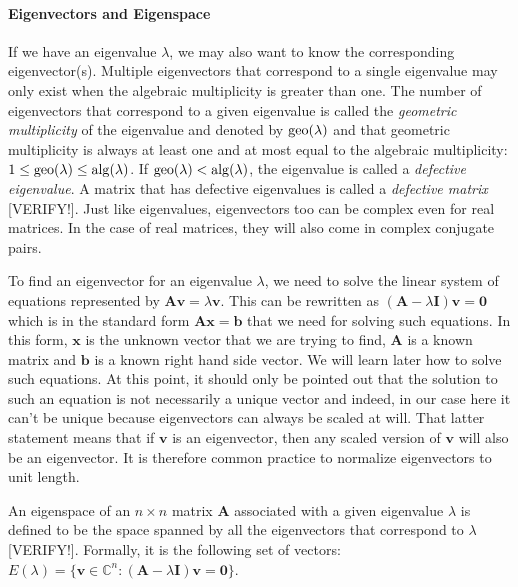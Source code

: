 \paragraph{Eigenvectors and Eigenspace}
If we have an eigenvalue $\lambda$, we may also want to know the corresponding eigenvector(s). Multiple eigenvectors that correspond to a single eigenvalue may only exist when the algebraic multiplicity is greater than one. The number of eigenvectors that correspond to a given eigenvalue is called the \emph{geometric multiplicity} of the eigenvalue and denoted by $\operatorname{geo}(\lambda)$ and that geometric multiplicity is always at least one and at most equal to the algebraic multiplicity: $1 \leq \operatorname{geo}(\lambda) \leq \operatorname{alg}(\lambda)$. If $\operatorname{geo}(\lambda) < \operatorname{alg}(\lambda)$, the eigenvalue is called a \emph{defective eigenvalue}. A matrix that has defective eigenvalues is called a \emph{defective matrix} [VERIFY!]. Just like eigenvalues, eigenvectors too can be complex even for real matrices. In the case of real matrices, they will also come in complex conjugate pairs. 

\medskip
To find an eigenvector for an eigenvalue $\lambda$, we need to solve the linear system of equations represented by $\mathbf{A v} = \lambda \mathbf{v}$.  This can be rewritten as $(\mathbf{A} - \lambda \mathbf{I}) \mathbf{v} = \mathbf{0}$ which is in the standard form $\mathbf{A x} = \mathbf{b}$ that we need for solving such equations. In this form, $\mathbf{x}$ is the unknown vector that we are trying to find, $\mathbf{A}$ is a known matrix and $\mathbf{b}$ is a known right hand side vector. We will learn later how to solve such equations. At this point, it should only be pointed out that the solution to such an equation is not necessarily a unique vector and indeed, in our case here it can't be unique because eigenvectors can always be scaled at will. That latter statement means that if $\mathbf{v}$ is an eigenvector, then any scaled version of $\mathbf{v}$ will also be an eigenvector. It is therefore common practice to normalize eigenvectors to unit length.

\medskip
An eigenspace of an $n \times n$ matrix $\mathbf{A}$ associated with a given eigenvalue $\lambda$ is defined to be the space spanned by all the eigenvectors that correspond to $\lambda$ [VERIFY!]. Formally, it is the following set of vectors: $E(\lambda) = \{\mathbf{v} \in \mathbb{C}^n : (\mathbf{A} - \lambda \mathbf{I}) \mathbf{v} = \mathbf{0}\}$. 


